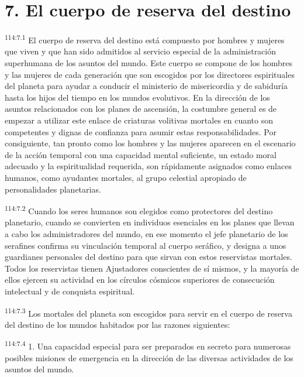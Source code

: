 \documentclass[twoside, 11pt]{book}
\begin{document}
\section*{7. El cuerpo de reserva del destino}
\par
\textsuperscript{114:7.1} El cuerpo de reserva del destino está compuesto por hombres y mujeres que viven y que han sido admitidos al servicio especial de la administración superhumana de los asuntos del mundo. Este cuerpo se compone de los hombres y las mujeres de cada generación que son escogidos por los directores espirituales del planeta para ayudar a conducir el ministerio de misericordia y de sabiduría hasta los hijos del tiempo en los mundos evolutivos. En la dirección de los asuntos relacionados con los planes de ascensión, la costumbre general es de empezar a utilizar este enlace de criaturas volitivas mortales en cuanto son competentes y dignas de confianza para asumir estas responsabilidades. Por consiguiente, tan pronto como los hombres y las mujeres aparecen en el escenario de la acción temporal con una capacidad mental suficiente, un estado moral adecuado y la espiritualidad requerida, son rápidamente asignados como enlaces humanos, como ayudantes mortales, al grupo celestial apropiado de personalidades planetarias.

\par
\textsuperscript{114:7.2} Cuando los seres humanos son elegidos como protectores del destino planetario, cuando se convierten en individuos esenciales en los planes que llevan a cabo los administradores del mundo, en ese momento el jefe planetario de los serafines confirma su vinculación temporal al cuerpo seráfico, y designa a unos guardianes personales del destino para que sirvan con estos reservistas mortales. Todos los reservistas tienen Ajustadores conscientes de sí mismos, y la mayoría de ellos ejercen su actividad en los círculos cósmicos superiores de consecución intelectual y de conquista espiritual.

\par
\textsuperscript{114:7.3} Los mortales del planeta son escogidos para servir en el cuerpo de reserva del destino de los mundos habitados por las razones siguientes:

\par
\textsuperscript{114:7.4} 1. Una capacidad especial para ser preparados en secreto para numerosas posibles misiones de emergencia en la dirección de las diversas actividades de los asuntos del mundo.
\end{document}
